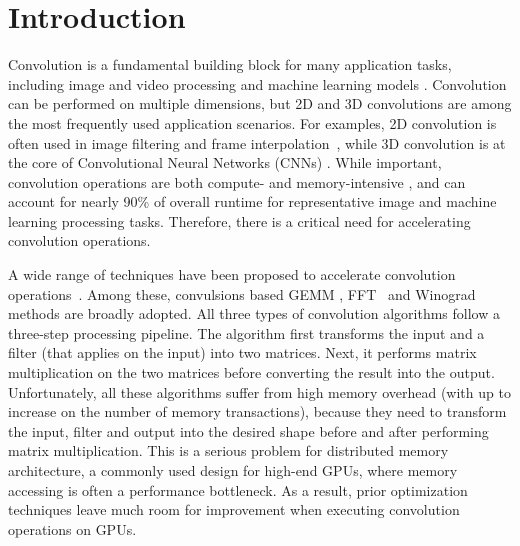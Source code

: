 \section{Introduction}
Convolution is a fundamental building block for many application tasks, including image and video processing and machine learning
models \cite{Perrot2014Fine,Ma2014Optimized,Rudi2015Image,Niklaus2017Video,Krizhevsky2012ImageNet,SimonyanZ14a,HeZRS16,SzegedyLJSRAEVR15}. Convolution can be performed on multiple dimensions, but 2D and 3D convolutions are among the most frequently used
application scenarios. For examples, 2D convolution is often used in image filtering and frame
interpolation~\cite{Perrot2014Fine,Ma2014Optimized,Rudi2015Image,Niklaus2017Video}, while 3D convolution is at the core of Convolutional
Neural Networks (CNNs) \cite{Krizhevsky2012ImageNet,SimonyanZ14a,HeZRS16,SzegedyLJSRAEVR15}. While important, convolution operations are both compute- and memory-intensive \cite{cavigelli2015accelerating},
and can account for nearly 90\% of overall runtime \cite{Li2016Performance} for representative image and machine learning processing tasks.
Therefore, there is a critical need for accelerating convolution operations.


A wide range of techniques have been proposed to accelerate convolution
operations~\cite{Iandola2014Communication,vasilache2014fast,lavin2016fast,cho2017mec,Zhen2018Optimizing,Vasudevan2017Parallel,Chellapilla2006High}.
 Among these, convulsions based GEMM
\cite{Vasudevan2017Parallel,Chellapilla2006High}, FFT~\cite{vasilache2014fast} and Winograd~\cite{lavin2016fast} methods are broadly
adopted. All three types of convolution algorithms follow a three-step processing pipeline. The algorithm first transforms the input and a
filter (that applies on the input) into two matrices. Next, it performs matrix multiplication on the two matrices before converting the
result into the output. Unfortunately, all these algorithms suffer from high memory overhead (with up to  increase on the
number of memory transactions), because they need to transform the input, filter and output into the desired shape before and after
performing matrix multiplication.  This is a serious problem for
distributed memory architecture, a commonly used design for high-end GPUs, where memory accessing is often a performance bottleneck. As a
result, prior optimization techniques leave much room for improvement when executing convolution operations on GPUs.


